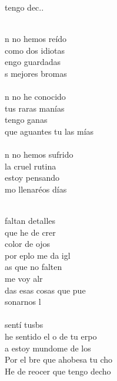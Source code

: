 \begin{cancion}
\begin{chorus}
	tengo dec..\\
	\end{chorus}%
	\jump\\
	n no hemos reído \\
como dos idiotas\\
	engo guardadas \\
	s mejores bromas\\
\jump\\
	n no he conocido \\
tus raras manías\\
	 tengo ganas \\
	 que aguantes tu las mías\\
\jump\\
	n no hemos sufrido \\
la cruel rutina\\
	 estoy pensando \\
	mo llenaréos días \\\jump\\
	\begin{chorus}%
	faltan detalles \\
	que he de crer\\
	color de ojos \\
	por eplo me da igl\\
	as que no falten \\
	me voy alr\\
	das esas cosas que pue \\
	sonarnos l\\
\jump\\
	sentí tusbs\\
	he sentido el o de tu erpo\\
	a estoy mundome de los \\
	Por el bre que ahobesa tu cho\\
	He de reocer que tengo decho\\

\end{chorus}
\end{cancion}

